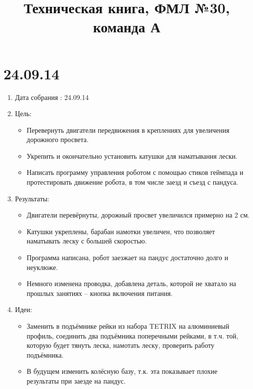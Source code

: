 \documentclass[12pt]{article}
\title{ Техническая книга, ФМЛ №30, команда А}
\begin{document}
	\section{24.09.14}
	\begin{enumerate}
		\item Дата собрания : 24.09.14
		\item Цель:
		\begin{itemize}
			\item Перевернуть двигатели передвижения в креплениях для увеличения дорожного просвета.
			\item Укрепить и окончательно установить катушки для наматывания лески.
			\item Написать программу управления роботом с помощью стиков геймпада и протестировать движение робота, в том числе заезд и съезд с пандуса.
		\end{itemize}
		\item Результаты:
		\begin{itemize}
			\item Двигатели перевёрнуты, дорожный просвет увеличился примерно на 2 см.
			\item Катушки укреплены, барабан намотки увеличен, что позволяет наматывать леску с большей скоростью.
			\item Программа написана, робот заезжает на пандус достаточно долго и неуклюже.
			\item Немного изменена проводка, добавлена деталь, которой не хватало на прошлых занятиях – кнопка включения питания.
		\end{itemize}	
		\item Идеи:
		\begin{itemize}
			\item Заменить в подъёмнике рейки из набора TETRIX на алюминиевый профиль, соединить два подъёмника поперечными рейками, в т.ч. той, которую будет тянуть леска, намотать леску, проверить работу подъёмника.
			\item В будущем изменить колёсную базу, т.к. эта показывает плохие результаты при заезде на пандус.
		\end{itemize}
	\end{enumerate}
\end{document}

